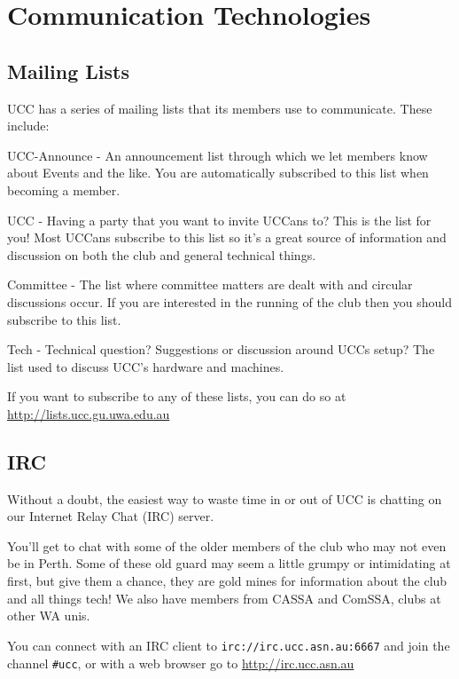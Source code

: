\chapter{Communication Technologies}


\section{Mailing Lists}

UCC has a series of mailing lists that its members use to communicate. 
These include: 

UCC-Announce - An announcement list through which we let 
members know about Events and the like. You are automatically 
subscribed to this list when becoming a member. 

UCC - Having a party that you want to invite UCCans to? This is the 
list for you! Most UCCans subscribe to this list so it's a great 
source of information and discussion on both the club and general 
technical things. 

Committee - The list where committee matters are dealt with and circular 
discussions occur. If you are interested in the running of the club then 
you should subscribe to this list. 

Tech - Technical question? Suggestions or discussion around UCCs setup? 
The list used to discuss UCC's hardware and machines. 

If you want to subscribe to any of these lists, you can do so at 
\url{http://lists.ucc.gu.uwa.edu.au}

\section{IRC}

Without a doubt, the easiest way to waste time in or out of UCC 
is chatting on our Internet Relay Chat (IRC) server. 

You'll get to chat with some of the older members of the club who 
may not even be in Perth. Some of these old guard may seem a 
little grumpy or intimidating at first, but give them a chance, they 
are gold mines for information about the club and all things tech! 
We also have members from CASSA and ComSSA, clubs at other WA unis. 

You can connect with an IRC client to \texttt{irc://irc.ucc.asn.au:6667} 
and join the channel \texttt{\#ucc}, or with a web browser go to 
\url{http://irc.ucc.asn.au}
